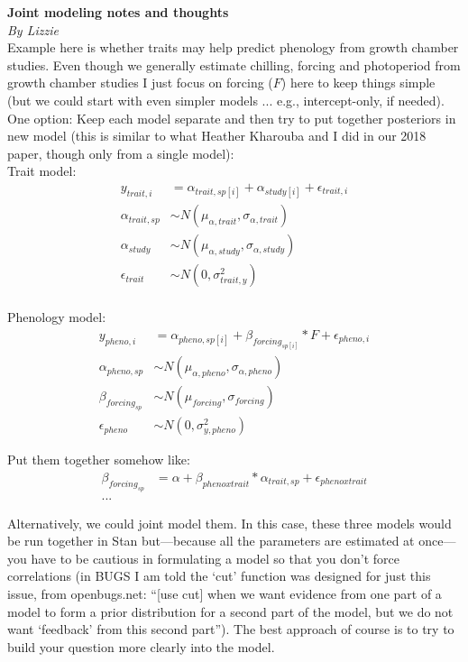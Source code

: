 \documentclass[11pt,letter]{article}
\begin{document}

\renewcommand{\refname}{\CHead{}}

{\bf Joint modeling notes and thoughts}\\
\emph{By Lizzie}\\

Example here is whether traits may help predict phenology from growth chamber studies. Even though we generally estimate chilling, forcing and photoperiod from growth chamber studies I just focus on forcing ($F$) here to keep things simple (but we could start with even simpler models ... e.g., intercept-only, if needed).\\

One option: Keep each model separate and then try to put together posteriors in new model (this is similar to what Heather Kharouba and I did in our 2018 paper, though only from a single model):\\

Trait model:
\begin{align*}
y_{trait, i} &= \alpha_{trait, sp[i]} + \alpha_{study[i]} + \epsilon_{trait, i}\\
\alpha_{trait, sp} & \sim N(\mu_{\alpha, trait}, \sigma_{\alpha, trait}) \\
\alpha_{study}  & \sim N(\mu_{\alpha, study}, \sigma_{\alpha, study})\\
\epsilon_{trait} & \sim N(0,\sigma^2_{trait, y}) \\
\end{align*}

Phenology model:
\begin{align*}
y_{pheno, i} &= \alpha_{pheno, sp[i]} + \beta_{forcing_{sp[i]}}*F+ \epsilon_{pheno, i}\\
\alpha_{pheno, sp} & \sim N(\mu_{\alpha, pheno}, \sigma_{\alpha, pheno}) \\
\beta_{forcing_{sp}} & \sim N(\mu_{forcing}, \sigma_{forcing})\\
\epsilon_{pheno} & \sim N(0,\sigma^2_{y, pheno}) 
\end{align*}

Put them together somehow like:
\begin{align*}
\beta_{forcing_{sp}} &= \alpha + \beta_{pheno x trait}*\alpha_{trait, sp} + \epsilon_{pheno x trait}\\
...
\end{align*}

Alternatively, we could joint model them. In this case, these three models would be run together in Stan but---because all the parameters are estimated at once---you have to be cautious in formulating a model so that you don't force correlations (in BUGS I am told the `cut' function was designed for just this issue, from openbugs.net: ``[use cut] when we want evidence from one part of a model to form a prior distribution for a second part of the model, but we do not want `feedback' from this second part''). The best approach of course is to try to build your question more clearly into the model. \\
\end{document}
